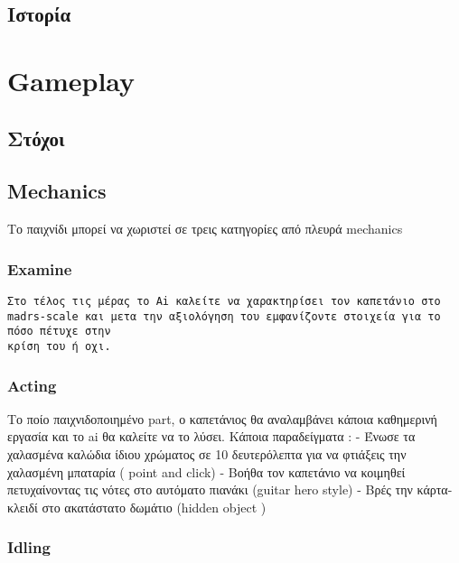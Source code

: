 \documentclass[
]{article}
\begin{document}
\hypertarget{ux3b9ux3c3ux3c4ux3bfux3c1ux3afux3b1}{%
\subsection{Ιστορία}\label{ux3b9ux3c3ux3c4ux3bfux3c1ux3afux3b1}}

\hypertarget{gameplay}{%
\section{Gameplay}\label{gameplay}}

\hypertarget{ux3c3ux3c4ux3ccux3c7ux3bfux3b9}{%
\subsection{Στόχοι}\label{ux3c3ux3c4ux3ccux3c7ux3bfux3b9}}

\hypertarget{mechanics}{%
\subsection{Mechanics}\label{mechanics}}

Το παιχνίδι μπορεί να χωριστεί σε τρεις κατηγορίες από πλευρά mechanics

\hypertarget{examine}{%
\subsubsection{Examine}\label{examine}}

\begin{verbatim}
Στο τέλος τις μέρας το Ai καλείτε να χαρακτηρίσει τον καπετάνιο στο madrs-scale και μετα την αξιολόγηση του εμφανίζοντε στοιχεία για το πόσο πέτυχε στην 
κρίση του ή οχι.
\end{verbatim}

\hypertarget{acting}{%
\subsubsection{Acting}\label{acting}}

Το ποίο παιχνιδοποιημένο part, ο καπετάνιος θα αναλαμβάνει κάποια
καθημερινή εργασία και το ai θα καλείτε να το λύσει. Κάποια παραδείγματα
: - Ένωσε τα χαλασμένα καλώδια ίδιου χρώματος σε 10 δευτερόλεπτα για να
φτιάξεις την χαλασμένη μπαταρία ( point and click) - Βοήθα τον καπετάνιο
να κοιμηθεί πετυχαίνοντας τις νότες στο αυτόματο πιανάκι (guitar hero
style) - Βρές την κάρτα-κλειδί στο ακατάστατο δωμάτιο (hidden object )

\hypertarget{idling}{%
\subsubsection{Idling}\label{idling}}
\end{document}
